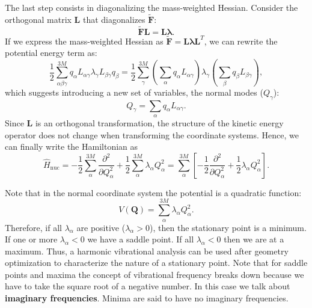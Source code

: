 \documentclass[../Main/chem532-notes.tex]{subfiles}
\begin{document}
The last step consists in diagonalizing the mass-weighted Hessian. Consider the orthogonal matrix $\mathbf{L}$ that diagonalizes $\tilde{\mathbf{F}}$:
\begin{equation}
\tilde{\mathbf{F}}\mathbf{L} = \mathbf{L}\boldsymbol{\lambda}.
\end{equation}
If we express the mass-weighted Hessian as $\tilde{\mathbf{F}} = \mathbf{L}\boldsymbol{\lambda}\mathbf{L}^{T}$, we can rewrite the potential energy term as:
\begin{equation}
\frac{1}{2} \sum_{\alpha\beta\gamma}^{3M} q_\alpha  L_{\alpha\gamma} \lambda_\gamma L_{\beta\gamma} q_\beta
= \frac{1}{2} \sum_{\gamma}^{3M} (\sum_{\alpha} q_\alpha  L_{\alpha\gamma})\lambda_\gamma (\sum_{\beta} q_\beta L_{\beta\gamma}),
\end{equation}
which suggests introducing a new set of variables, the normal modes ($Q_\gamma$):
\begin{equation}
Q_\gamma = \sum_{\alpha} q_\alpha  L_{\alpha\gamma}.
\end{equation}
Since $\mathbf{L}$ is an orthogonal transformation, the structure of the kinetic energy operator does not change when transforming the coordinate systems. Hence, we can finally write the Hamiltonian as
\begin{equation}
\hat{H}_\mathrm{nuc} = -\frac{1}{2} \sum_\alpha^{3M} \frac{\partial^2}{\partial Q_\alpha^2} + \frac{1}{2} \sum_\alpha^{3M} \lambda_\alpha Q_\alpha^2
= \sum_\alpha^{3M} \left[
-\frac{1}{2} \frac{\partial^2}{\partial Q_\alpha^2} + \frac{1}{2} \lambda_\alpha Q_\alpha^2
\right].
\end{equation}

Note that in the normal coordinate system the potential is a quadratic function:
\begin{equation}
V(\mathbf{Q}) = \sum_\alpha^{3M} \lambda_\alpha Q_\alpha^2.
\end{equation}
Therefore, if all $\lambda_\alpha$ are positive ($\lambda_\alpha > 0$), then the stationary point is a minimum.
If one or more $\lambda_\alpha < 0$ we have a saddle point.
If all $\lambda_\alpha < 0$ then we are at a maximum.
Thus, a harmonic vibrational analysis can be used after geometry optimization to characterize the nature of a stationary point.
Note that for saddle points and maxima the concept of vibrational frequency breaks down because we have to take the square root of a negative number.
In this case we talk about \textbf{imaginary frequencies}.
Minima are said to have no imaginary frequencies.
\end{document}
